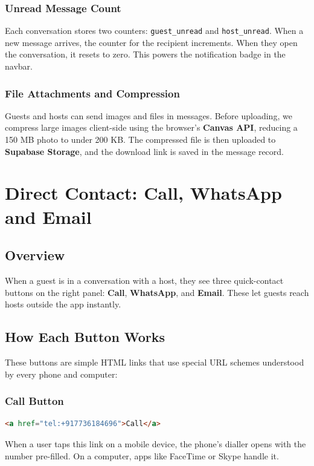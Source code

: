 \documentclass[12pt,a4paper]{article}
\begin{document}
\subsubsection{Unread Message Count}
Each conversation stores two counters: \texttt{guest\_unread} and \texttt{host\_unread}. When a new message arrives, the counter for the recipient increments. When they open the conversation, it resets to zero. This powers the notification badge in the navbar.

\subsubsection{File Attachments and Compression}
Guests and hosts can send images and files in messages. Before uploading, we compress large images client-side using the browser's \textbf{Canvas API}, reducing a 150 MB photo to under 200 KB. The compressed file is then uploaded to \textbf{Supabase Storage}, and the download link is saved in the message record.

\newpage
\section{Direct Contact: Call, WhatsApp and Email}

\subsection{Overview}
When a guest is in a conversation with a host, they see three quick-contact buttons on the right panel: \textbf{Call}, \textbf{WhatsApp}, and \textbf{Email}. These let guests reach hosts outside the app instantly.

\subsection{How Each Button Works}

These buttons are simple HTML links that use special URL schemes understood by every phone and computer:

\subsubsection{Call Button}
\begin{lstlisting}[language=HTML, caption=Phone Call Link]
<a href="tel:+917736184696">Call</a>
\end{lstlisting}
When a user taps this link on a mobile device, the phone's dialler opens with the number pre-filled. On a computer, apps like FaceTime or Skype handle it.
\end{document}
